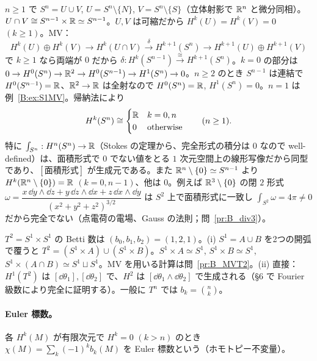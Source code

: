 \begin{ex}[$S^n$]\label{B:ex:Sn}
$n\ge1$ で $S^n=U\cup V$, $U=S^n\setminus\{N\}$, $V=S^n\setminus\{S\}$（立体射影で $\mathbb R^n$ と微分同相）。$U\cap V\cong S^{n-1}\times\mathbb R\simeq S^{n-1}$。$U,V$ は可縮だから $H^k(U)=H^k(V)=0$ $(k\ge1)$。MV：
\[
H^k(U)\oplus H^k(V)\to H^k(U\cap V)\xrightarrow{\delta}H^{k+1}(S^n)\to H^{k+1}(U)\oplus H^{k+1}(V)
\]
で $k\ge1$ なら両端が $0$ だから $\delta:H^k(S^{n-1})\xrightarrow{\ \cong\ }H^{k+1}(S^n)$。$k=0$ の部分は
$0\to H^0(S^n)\to\mathbb R^2\to H^0(S^{n-1})\to H^1(S^n)\to0$。$n\ge2$ のとき $S^{n-1}$ は連結で $H^0(S^{n-1})=\mathbb R$、$\mathbb R^2\to\mathbb R$ は全射なので $H^0(S^n)=\mathbb R$, $H^1(S^n)=0$。$n=1$ は例~\ref{B:ex:S1MV}。帰納法により
\[
H^k(S^n)\cong\begin{cases}\mathbb R&k=0,n\\0&\text{otherwise}\end{cases}\qquad(n\ge1).
\]
特に $\int_{S^n}:H^n(S^n)\to\mathbb R$（Stokes の定理から、完全形式の積分は $0$ なので well-defined）は、面積形式で $0$ でない値をとる $1$ 次元空間上の線形写像だから同型であり、$[\text{面積形式}]$ が生成元である。また $\mathbb R^n\setminus\{0\}\simeq S^{n-1}$ より $H^k(\mathbb R^n\setminus\{0\})=\mathbb R$ $(k=0,n-1)$、他は $0$。例えば $\mathbb R^3\setminus\{0\}$ の閉 $2$ 形式 $\omega=\dfrac{x\,\dd y\wedge\dd z+y\,\dd z\wedge\dd x+z\,\dd x\wedge\dd y}{(x^2+y^2+z^2)^{3/2}}$ は $S^2$ 上で面積形式に一致し $\int_{S^2}\omega=4\pi\neq0$ だから完全でない（点電荷の電場、Gauss の法則；問~\ref{pr:B_div3}）。
\end{ex}

\begin{ex}[トーラス $T^2$]\label{B:ex:T2}
$T^2=S^1\times S^1$ の Betti 数は $(b_0,b_1,b_2)=(1,2,1)$。(i) $S^1=A\cup B$ を2つの開弧で覆うと $T^2=(S^1\times A)\cup(S^1\times B)$。$S^1\times A\simeq S^1$, $S^1\times B\simeq S^1$, $S^1\times(A\cap B)\simeq S^1\sqcup S^1$。MV を用いる計算は問~\ref{pr:B_MVT2}。(ii) 直接：$H^1(T^2)$ は $[\dd\theta_1],[\dd\theta_2]$ で、$H^2$ は $[\dd\theta_1\wedge\dd\theta_2]$ で生成される（§6 で Fourier 級数により完全に証明する）。一般に $T^n$ では $b_k=\binom nk$。
\end{ex}

\paragraph{Euler 標数。}各 $H^k(M)$ が有限次元で $H^k=0$ $(k>n)$ のとき $\chi(M)=\sum_k(-1)^kb_k(M)$ を Euler 標数という（ホモトピー不変量）。

